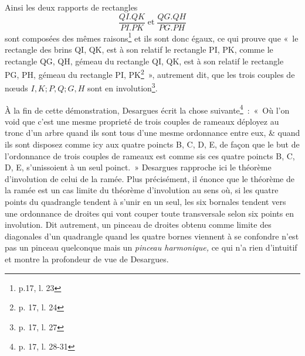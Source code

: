 \documentclass[12pt, a4paper]{article}
\begin{document}
Ainsi les deux rapports de rectangles 
\[
\frac{QI.QK}{PI.PK}\;\mbox{et}\;\frac{QG.QH}{PG.PH}
\]
sont composées des mêmes raisons\footnote{p.17, l. 23} et ils sont donc égaux, ce qui prouve que «~le rectangle des brins QI, QK, est à son relatif le rectangle PI, PK, comme le rectangle QG, QH, gémeau du rectangle QI, QK, est à son relatif le rectangle PG, PH, gémeau du rectangle PI, PK\footnote{p. 17, l. 24}~», autrement dit, que les trois couples de n{\oe}uds $I,K; P,Q; G,H$ sont en involution\footnote{p. 17, l. 27}.

À la fin de cette démonstration, Desargues écrit la chose suivante\footnote{p. 17, l. 28-31}~:~«~Où l'on void que c'est une mesme proprieté de trois couples de rameaux déployez au tronc d'un arbre quand ils sont tous d'une mesme ordonnance entre eux, \& quand ils sont disposez comme icy aux quatre poincts B, C, D, E, de façon que le but de l'ordonnance de trois couples de rameaux est comme sis ces quatre poincts B, C, D, E, s'unissoient à un seul poinct.~» Desargues rapproche ici le théorème d'involution de celui de la ramée. Plus précisément, il énonce que le théorème de la ramée est un cas limite du théorème d'involution au sens où, si les quatre points du quadrangle tendent à s'unir en un seul, les six bornales tendent vers une ordonnance de droites qui vont couper toute transversale selon six points en involution. Dit autrement, un pinceau de droites obtenu comme limite des diagonales d'un quadrangle quand les quatre bornes viennent à se confondre  n'est pas un pinceau quelconque mais un \textit{pinceau harmonique,} ce qui n'a rien d'intuitif et montre la profondeur de vue de Desargues. 
\end{document}
